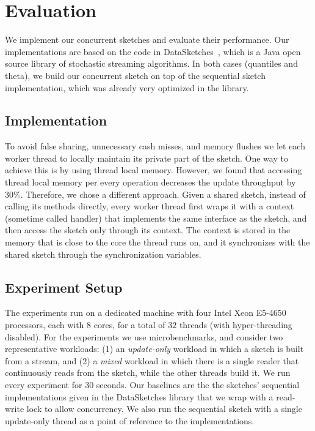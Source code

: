 \section{Evaluation}
\label{sec:evaluation}




We implement our concurrent sketches and evaluate their
performance.
Our implementations are based on the
code in DataSketches~\cite{sketchesLibrary}, which is a Java
open source library of stochastic streaming algorithms.
In both cases (quantiles and theta), we build our concurrent
sketch on top of the sequential sketch implementation, which was
already very optimized in the library.

\subsection{Implementation}
\label{sub:imp}

To avoid false sharing, unnecessary cash misses, and memory
flushes we let each worker thread to locally maintain its private
part of the sketch.
One way to achieve this is by using thread local memory.
However, we found that accessing thread local memory per
every operation decreases the update throughput by $30\%$.
Therefore, we chose a different approach.
Given a shared sketch, instead of calling its methods
directly, every worker thread first wraps it with a context
(sometime called handler) that implements the same interface as
the sketch, and then access the sketch only through its context.
The context is stored in the memory that is close to the core
the thread runs on, and it synchronizes with the shared sketch through the synchronization variables.

  

\subsection{Experiment Setup}
\label{sub:setup}

The experiments run on a dedicated machine with four Intel
Xeon E5-4650 processors, each with $8$ cores, for a total of
$32$ threads (with hyper-threading disabled).
For the experiments we use microbenchmarks, and consider two
representative workloads: (1) an \emph{update-only} workload in
which a sketch is built from a stream, and (2) a \emph{mixed}
workload in which there is a single reader that continuously reads
from the sketch, while the other threads build it.
We run every experiment for 30 seconds. 
Our baselines are the the sketches' sequential implementations
given in the DataSketches library that we wrap with a read-write lock
to allow concurrency.
We also run the sequential sketch with a single update-only thread as a point of reference to the implementations.

